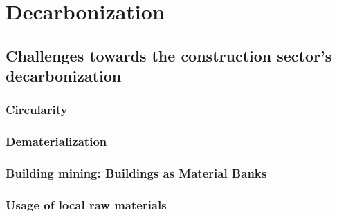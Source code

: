 \section[Decarbonization]{Decarbonization}
\label{sec:challenges_towards_the_construction_sector_decarbonization}

\subsection{Challenges towards the construction sector's decarbonization}
\label{sec:Challenges_towards_the_construction_sector_decarbonization}

\subsubsection{Circularity}
\label{sec:circularity}

\subsubsection{Dematerialization}
\label{sec:dematerialization}

\subsubsection{Building mining: Buildings as Material Banks}
\label{sec:building_mining_buildings_material_banks}

\label{sec:building_material_passport}

\subsubsection{Usage of local raw materials}
\label{sec:usage_local_raw_materials}


